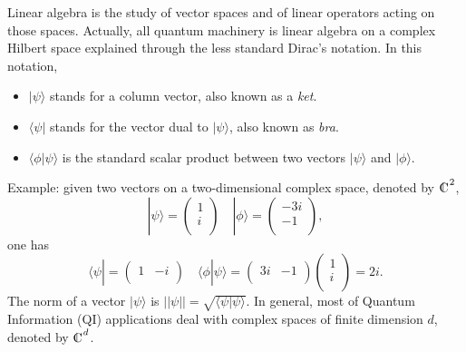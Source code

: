 \documentclass[a4paper]{article}
\def\compl{\begin{picture}(8,8)\put(0,0){C}\put(3,0.3){\line(0,1){7}}\end{picture}}
\def\bra#1{\langle#1|} \def\ket#1{|#1\rangle}
\begin{document}
Linear algebra is the study of vector spaces and of linear
operators acting on those spaces. Actually, all quantum machinery is
linear algebra on a complex Hilbert space explained through the
less standard Dirac's notation. In this notation,
\begin{itemize}
    \item $\ket{\psi}$ stands for a column vector, also known as a
    \emph{ket}.
    \item $\bra{\psi}$ stands for the vector dual to $\ket{\psi}$, also known as
    \emph{bra}.
    \item $\langle\phi\ket{\psi}$ is the standard scalar
    product between two vectors $\ket{\psi}$ and
    $\ket{\phi}$.
\end{itemize}
Example: given two vectors on a two-dimensional complex space,
denoted by $\compl^2$,
\begin{equation}
    \ket{\psi}=\begin{pmatrix}1 \\i \\\end{pmatrix} \quad
    \ket{\phi}=\begin{pmatrix}-3i \\-1 \\\end{pmatrix} ,
\end{equation}
one has
\begin{equation}
    \bra{\psi}=\begin{pmatrix}1 &-i \\\end{pmatrix} \quad
    \langle\phi\ket{\psi}=\begin{pmatrix}3i &-1 \\\end{pmatrix}
    \begin{pmatrix}1 \\i \\\end{pmatrix}=2i .
\end{equation}
The norm of a vector $\ket{\psi}$ is
$||\psi||=\sqrt{\langle\psi\ket{\psi}}$. In general, most of Quantum Information (QI)
applications deal with complex spaces of finite dimension $d$, denoted by
$\compl^d$.
\end{document}
